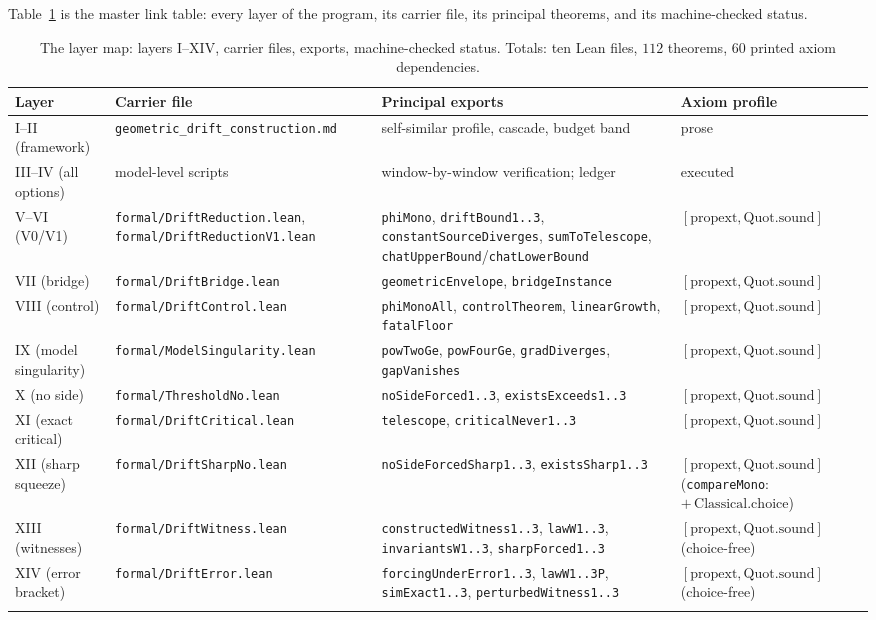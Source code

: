 \documentclass[11pt]{article}
\begin{document}
Table~\ref{tab:map} is the master link table: every layer of the program, its carrier file,
its principal theorems, and its machine-checked status.

\begin{longtable}{p{} p{} p{} p{}}
\hline
\textbf{Layer} & \textbf{Carrier file} & \textbf{Principal exports} & \textbf{Axiom profile}\\
\hline
\endhead
I--II (framework) & \texttt{geometric\_drift\_construction.md} & self-similar profile, cascade, budget band & prose\\
\hline
III--IV (all options) & model-level scripts & window-by-window verification; ledger & executed\\
\hline
V--VI (V0/V1) & \texttt{formal/DriftReduction.lean}, \texttt{formal/DriftReductionV1.lean} &
\texttt{phiMono}, \texttt{driftBound1..3}, \texttt{constantSourceDiverges},
\texttt{sumToTelescope}, \texttt{chatUpperBound}/\texttt{chatLowerBound} &
$[\mathrm{propext},\mathrm{Quot.sound}]$\\
\hline
VII (bridge) & \texttt{formal/DriftBridge.lean} & \texttt{geometricEnvelope},
\texttt{bridgeInstance} & $[\mathrm{propext},\mathrm{Quot.sound}]$\\
\hline
VIII (control) & \texttt{formal/DriftControl.lean} & \texttt{phiMonoAll},
\texttt{controlTheorem}, \texttt{linearGrowth}, \texttt{fatalFloor} &
$[\mathrm{propext},\mathrm{Quot.sound}]$\\
\hline
IX (model singularity) & \texttt{formal/ModelSingularity.lean} & \texttt{powTwoGe},
\texttt{powFourGe}, \texttt{gradDiverges}, \texttt{gapVanishes} &
$[\mathrm{propext},\mathrm{Quot.sound}]$\\
\hline
X (no side) & \texttt{formal/ThresholdNo.lean} & \texttt{noSideForced1..3},
\texttt{existsExceeds1..3} & $[\mathrm{propext},\mathrm{Quot.sound}]$\\
\hline
XI (exact critical) & \texttt{formal/DriftCritical.lean} & \texttt{telescope},
\texttt{criticalNever1..3} & $[\mathrm{propext},\mathrm{Quot.sound}]$\\
\hline
XII (sharp squeeze) & \texttt{formal/DriftSharpNo.lean} & \texttt{noSideForcedSharp1..3},
\texttt{existsSharp1..3} & $[\mathrm{propext},\mathrm{Quot.sound}]$\newline
(\texttt{compareMono}: $+\,\mathrm{Classical.choice}$)\\
\hline
XIII (witnesses) & \texttt{formal/DriftWitness.lean} & \texttt{constructedWitness1..3},
\texttt{lawW1..3}, \texttt{invariantsW1..3}, \texttt{sharpForced1..3} &
$[\mathrm{propext},\mathrm{Quot.sound}]$\newline
(choice-free)\\
\hline
XIV (error bracket) & \texttt{formal/DriftError.lean} & \texttt{forcingUnderError1..3},
\texttt{lawW1..3P}, \texttt{simExact1..3}, \texttt{perturbedWitness1..3} &
$[\mathrm{propext},\mathrm{Quot.sound}]$\newline
(choice-free)\\
\hline
\caption{The layer map: layers I--XIV, carrier files, exports, machine-checked status.
Totals: ten Lean files, $112$ theorems, $60$ printed axiom dependencies.}
\label{tab:map}
\end{longtable}
\end{document}
